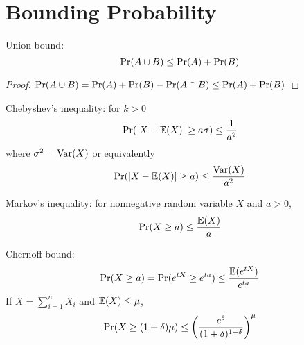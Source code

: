 \section{Bounding Probability}

Union bound:
$$
\mathrm{Pr}(A \cup B) \leq \mathrm{Pr}(A) + \mathrm{Pr}(B)
$$

\begin{proof}
    $\mathrm{Pr}(A \cup B) = \mathrm{Pr}(A) + \mathrm{Pr}(B) - \mathrm{Pr}(A \cap B) \leq \mathrm{Pr}(A) + \mathrm{Pr}(B)$
\end{proof}

Chebyshev's inequality: for $k > 0$
$$
\mathrm{Pr}(|X-\operatorname*{\mathbb{E}}(X)| \geq a \sigma) \leq \frac{1}{a^2}
$$
where $\sigma^2 = \mathrm{Var}(X)$ or equivalently
$$
\mathrm{Pr}(|X-\operatorname*{\mathbb{E}}(X)| \geq a) \leq \frac{\mathrm{Var}(X)}{a^2}
$$

Markov's inequality: for nonnegative random variable $X$ and $a>0$,
$$
\mathrm{Pr}(X \geq a) \leq \frac{\operatorname*{\mathbb{E}}(X)}{a}
$$

Chernoff bound:
$$
\mathrm{Pr}(X \geq a) = \mathrm{Pr}(e^{tX} \geq e^{ta}) \leq \frac{\operatorname*{\mathbb{E}}(e^{tX})}{e^{ta}}
$$
If $X = \sum_{i=1}^n X_i$ and $\operatorname*{\mathbb{E}}(X) \leq \mu$,
$$
\mathrm{Pr}(X \geq (1+\delta)\mu) \leq \left( \frac{e^\delta}{(1+\delta)^{1+\delta}} \right)^{\mu} 
$$ 